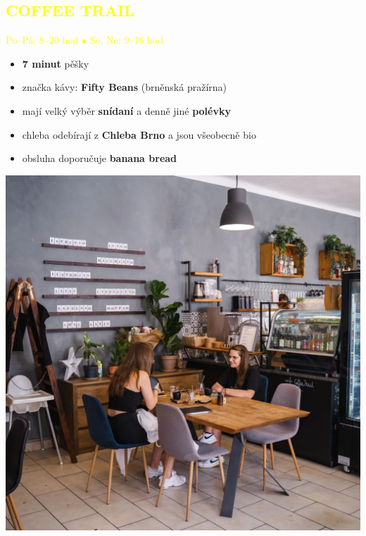 \documentclass[a5paper, twoside]{article}
\newcommand{\podnadpis}[2]{
  \subsection*{\textcolor{#2}{#1}}
}
\begin{document}
\noindent \begin{minipage}{0.7\textwidth}
	\podnadpis{COFFEE TRAIL}{yellow}
	\textcolor{yellow}{Po--Pá: 8--20 hod $\bullet$ So, Ne: 9--16 hod}
	\vspace{5pt}
	\small
	\begin{itemize}[leftmargin=10pt]
		\item \textbf{7 minut} pěšky
		\item značka kávy: \textbf{Fifty Beans} (brněnská pražírna)
		\item mají velký výběr \textbf{snídaní} a denně jiné \textbf{polévky}
		\item chleba odebírají z \textbf{Chleba Brno} a jsou všeobecně bio
		\item obsluha doporučuje \textbf{banana bread}
	\end{itemize}
\end{minipage}
\hfill
\begin{minipage}{0.27\textwidth}
	\includegraphics[width=\linewidth]{coffee_trail.jpg}
\end{minipage}
\end{document}
